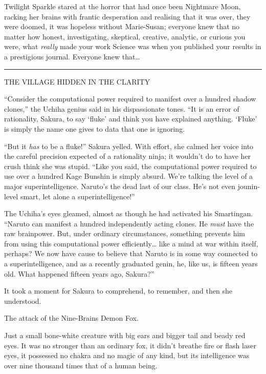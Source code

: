 Twilight Sparkle stared at the horror that had once been Nightmare Moon,
racking her brains with frantic desperation and realising that it was
over, they were doomed, it was hopeless without Marie-Susan; everyone
knew that no matter how honest, investigating, skeptical, creative,
analytic, or curious you were, what \emph{really} made your work Science
was when you published your results in a prestigious journal. Everyone
knew that\ldots{}

\begin{center}\rule{3in}{0.4pt}\end{center}

THE VILLAGE HIDDEN IN THE CLARITY

``Consider the computational power required to manifest over a hundred
shadow clones,'' the Uchiha genius said in his dispassionate tones. ``It
is an error of rationality, Sakura, to say `fluke' and think you have
explained anything. `Fluke' is simply the name one gives to data that
one is ignoring.

``But it \emph{has} to be a fluke!'' Sakura yelled. With effort, she
calmed her voice into the careful precision expected of a rationality
ninja; it wouldn't do to have her crush think she was stupid. ``Like you
said, the computational power required to use over a hundred Kage
Bunshin is simply absurd. We're talking the level of a major
superintelligence. Naruto's the dead last of our class. He's not even
jounin-level smart, let alone a superintelligence!''

The Uchiha's eyes gleamed, almost as though he had activated his
Smartingan. ``Naruto can manifest a hundred independently acting clones.
He \emph{must} have the raw brainpower. But, under ordinary
circumstances, something prevents him from using this computational
power efficiently\ldots{} like a mind at war within itself, perhaps? We
now have cause to believe that Naruto is in some way connected to a
superintelligence, and as a recently graduated genin, he, like us, is
fifteen years old. What happened fifteen years ago, Sakura?''

It took a moment for Sakura to comprehend, to remember, and then she
understood.

The attack of the Nine-Brains Demon Fox.

Just a small bone-white creature with big ears and bigger tail and beady
red eyes. It was no stronger than an ordinary fox, it didn't breathe
fire or flash laser eyes, it possessed no chakra and no magic of any
kind, but its intelligence was over nine thousand times that of a human
being.


